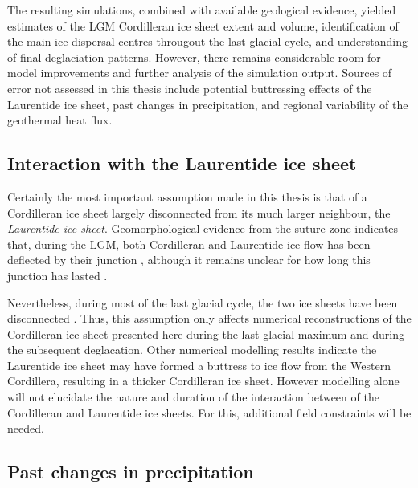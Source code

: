 \documentclass{article}
\begin{document}
The resulting simulations, combined with available geological evidence,
yielded estimates of the LGM Cordilleran ice sheet extent and volume,
identification of the main ice-dispersal centres througout the last glacial
cycle, and understanding of final deglaciation patterns. However, there remains
considerable room for model improvements and further analysis of the simulation
output. Sources of error not assessed in this thesis include potential
buttressing effects of the Laurentide ice sheet, past changes in precipitation,
and regional variability of the geothermal heat flux.


\subsection{Interaction with the Laurentide ice sheet}

Certainly the most important assumption made in this thesis is that of a
Cordilleran ice sheet largely disconnected from its much larger neighbour, the
\emph{Laurentide ice sheet}. Geomorphological evidence from the suture zone
indicates that, during the LGM, both Cordilleran and Laurentide ice flow has
been deflected by their junction \citep{Kleman.etal.2010, Margold.etal.2013,
Margold.etal.2013a}, although it remains unclear for how long this junction has
lasted \citep{Jackson.etal.1997, Bednarski.Smith.2007, Gowan.2013}.

Nevertheless, during most of the last glacial cycle, the two ice sheets have
been disconnected \citep{Kleman.etal.2010}. Thus, this assumption only affects
numerical reconstructions of the Cordilleran ice sheet presented here during
the last glacial maximum and during the subsequent deglacation. Other numerical
modelling results \citep{Gregoire.etal.2012} indicate the Laurentide ice sheet
may have formed a buttress to ice flow from the Western Cordillera, resulting
in a thicker Cordilleran ice sheet. However modelling alone will not elucidate
the nature and duration of the interaction between of the Cordilleran and
Laurentide ice sheets. For this, additional field constraints will be needed.


\subsection{Past changes in precipitation}
\end{document}
